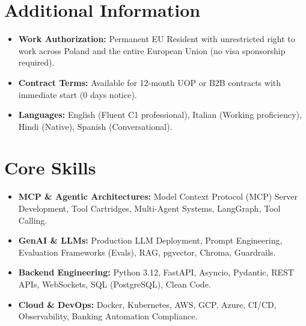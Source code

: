 \documentclass[a4paper,10pt]{article}
\begin{document}
\section{Additional Information}
\begin{itemize}
  \item \textbf{Work Authorization:} Permanent EU Resident with unrestricted right to work across Poland and the entire European Union (no visa sponsorship required).
  \item \textbf{Contract Terms:} Available for 12-month UOP or B2B contracts with immediate start (0 days notice).
  \item \textbf{Languages:} English (Fluent C1 professional), Italian (Working proficiency), Hindi (Native), Spanish (Conversational).
\end{itemize}

\section{Core Skills}
\begin{itemize}
  \item \textbf{MCP \& Agentic Architectures:} Model Context Protocol (MCP) Server Development, Tool Cartridges, Multi-Agent Systems, LangGraph, Tool Calling.
  \item \textbf{GenAI \& LLMs:} Production LLM Deployment, Prompt Engineering, Evaluation Frameworks (Evals), RAG, pgvector, Chroma, Guardrails.
  \item \textbf{Backend Engineering:} Python 3.12, FastAPI, Asyncio, Pydantic, REST APIs, WebSockets, SQL (PostgreSQL), Clean Code.
  \item \textbf{Cloud \& DevOps:} Docker, Kubernetes, AWS, GCP, Azure, CI/CD, Observability, Banking Automation Compliance.
\end{itemize}
\end{document}
